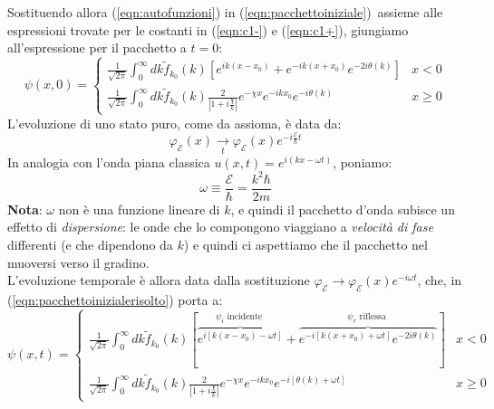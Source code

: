 \documentclass[../../FisicaTeorica.tex]{subfiles}
\begin{document}
Sostituendo allora (\ref{eqn:autofunzioni}) in (\ref{eqn:pacchettoiniziale})\ assieme alle espressioni trovate per le costanti in (\ref{eqn:c1-}) e (\ref{eqn:c1+}), giungiamo all'espressione per il pacchetto a $t=0$:
\begin{equation}
\psi(x,0)=\begin{cases}
\displaystyle
\frac{1}{\sqrt{2\pi}}\int_0^\infty dk \tilde{f}_{k_0}(k) \left[
e^{ik(x-x_0)}+e^{-ik(x+x_0)}e^{-2i\theta(k)}
\right] & x < 0\\ \displaystyle
\frac{1}{\sqrt{2\pi}}\int_0^\infty dk \tilde{f}_{k_0}(k) \frac{2}{\left|1+i\frac{\chi}{k} \right|}e^{-\chi x}e^{-ikx_0}e^{-i\theta(k)} & x\geq 0
\end{cases}
\label{eqn:pacchettoinizialerisolto}
\end{equation}
L'evoluzione di uno stato puro, come da assioma, è data da:%
\[
\varphi_\mathcal{E}(x)\xrightarrow[t]{}\varphi_\mathcal{E}(x)e^{-i\frac{\mathcal{E}}{\hbar}t}
\]
In analogia con l'onda piana classica $u(x,t)=e^{i(kx-\omega t)}$, poniamo:
\begin{equation}
\omega \equiv \frac{\mathcal{E}}{\hbar} = \frac{k^2 \hbar}{2m}
\label{eqn:omega}
\end{equation}
\textbf{Nota}: $\omega$ non è una funzione lineare di $k$, e quindi il pacchetto d'onda subisce un effetto di \textit{dispersione}: le onde che lo compongono viaggiano a \textit{velocità di fase} differenti (e che dipendono da $k$) e quindi ci aspettiamo che il pacchetto  nel muoversi verso il gradino.\\
L'evoluzione temporale è allora data dalla sostituzione $\varphi_\mathcal{E}\to \varphi_\mathcal{E}(x)e^{-i\omega t}$, che, in (\ref{eqn:pacchettoinizialerisolto}) porta a:
\[
\psi(x,t)=\begin{cases}\displaystyle
\frac{1}{\sqrt{2\pi}} \int_0^\infty dk \tilde{f}_{k_0}(k)
\left[
\overbrace{
e^{i[k(x-x_0)-\omega t]}}^{\psi_i \text{ incidente }}
+ \overbrace{e^{-i[k(x+x_0)+\omega t]}e^{-2i\theta(k)}}^{\psi_r \text{ riflessa }} 
\right] & x < 0
\\ \displaystyle
\frac{1}{\sqrt{2\pi}} \int_0^\infty dk \tilde{f}_{k_0}(k) \frac{2}{\left |1+i\frac{\chi}{k} \right|}e^{-\chi x}e^{-ikx_0}e^{-i[\theta(k)+\omega t]} & x\geq 0
\end{cases}
\]
\end{document}
